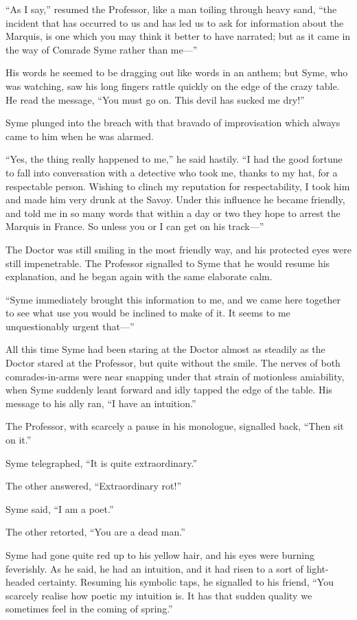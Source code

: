\documentclass{book}
\begin{document}
“As I say,” resumed the Professor, like a man toiling through heavy sand, “the incident that has occurred to us and has led us to ask for information about the Marquis, is one which you may think it better to have narrated; but as it came in the way of Comrade Syme rather than me—”

His words he seemed to be dragging out like words in an anthem; but Syme, who was watching, saw his long fingers rattle quickly on the edge of the crazy table. He read the message, “You must go on. This devil has sucked me dry!”

Syme plunged into the breach with that bravado of improvisation which always came to him when he was alarmed.

“Yes, the thing really happened to me,” he said hastily. “I had the good fortune to fall into conversation with a detective who took me, thanks to my hat, for a respectable person. Wishing to clinch my reputation for respectability, I took him and made him very drunk at the Savoy. Under this influence he became friendly, and told me in so many words that within a day or two they hope to arrest the Marquis in France. So unless you or I can get on his track—”

The Doctor was still smiling in the most friendly way, and his protected eyes were still impenetrable. The Professor signalled to Syme that he would resume his explanation, and he began again with the same elaborate calm.

“Syme immediately brought this information to me, and we came here together to see what use you would be inclined to make of it. It seems to me unquestionably urgent that—”

All this time Syme had been staring at the Doctor almost as steadily as the Doctor stared at the Professor, but quite without the smile. The nerves of both comrades-in-arms were near snapping under that strain of motionless amiability, when Syme suddenly leant forward and idly tapped the edge of the table. His message to his ally ran, “I have an intuition.”

The Professor, with scarcely a pause in his monologue, signalled back, “Then sit on it.”

Syme telegraphed, “It is quite extraordinary.”

The other answered, “Extraordinary rot!”

Syme said, “I am a poet.”

The other retorted, “You are a dead man.”

Syme had gone quite red up to his yellow hair, and his eyes were burning feverishly. As he said, he had an intuition, and it had risen to a sort of light-headed certainty. Resuming his symbolic taps, he signalled to his friend, “You scarcely realise how poetic my intuition is. It has that sudden quality we sometimes feel in the coming of spring.”
\end{document}
